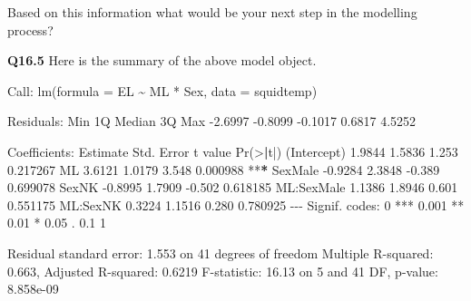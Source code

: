 \documentclass[
  oneside]{krantz}
\newenvironment{Shaded}{\begin{snugshade}}{\end{snugshade}}
\newcommand{\AttributeTok}[1]{\textcolor[rgb]{0.77,0.63,0.00}{#1}}
\newcommand{\DecValTok}[1]{\textcolor[rgb]{0.00,0.00,0.81}{#1}}
\newcommand{\ErrorTok}[1]{\textcolor[rgb]{0.64,0.00,0.00}{\textbf{#1}}}
\newcommand{\FloatTok}[1]{\textcolor[rgb]{0.00,0.00,0.81}{#1}}
\newcommand{\FunctionTok}[1]{\textcolor[rgb]{0.00,0.00,0.00}{#1}}
\newcommand{\NormalTok}[1]{#1}
\newcommand{\SpecialCharTok}[1]{\textcolor[rgb]{0.00,0.00,0.00}{#1}}
\newcommand{\StringTok}[1]{\textcolor[rgb]{0.31,0.60,0.02}{#1}}
\begin{document}
Based on this information what would be your next step in the modelling process?

\textbf{Q16.5} Here is the summary of the above model object.

\begin{Shaded}
\begin{Highlighting}[]
\NormalTok{Call}\SpecialCharTok{:}
\FunctionTok{lm}\NormalTok{(}\AttributeTok{formula =}\NormalTok{ EL }\SpecialCharTok{\textasciitilde{}}\NormalTok{ ML }\SpecialCharTok{*}\NormalTok{ Sex, }\AttributeTok{data =}\NormalTok{ squidtemp)}

\NormalTok{Residuals}\SpecialCharTok{:}
\NormalTok{    Min      1Q  Median      3Q     Max }
\SpecialCharTok{{-}}\FloatTok{2.6997} \SpecialCharTok{{-}}\FloatTok{0.8099} \SpecialCharTok{{-}}\FloatTok{0.1017}  \FloatTok{0.6817}  \FloatTok{4.5252} 

\NormalTok{Coefficients}\SpecialCharTok{:}
\NormalTok{                Estimate Std. Error t value }\FunctionTok{Pr}\NormalTok{(}\SpecialCharTok{\textgreater{}}\ErrorTok{|}\NormalTok{t}\SpecialCharTok{|}\NormalTok{)    }
\NormalTok{(Intercept)       }\FloatTok{1.9844}     \FloatTok{1.5836}   \FloatTok{1.253} \FloatTok{0.217267}    
\NormalTok{ML                }\FloatTok{3.6121}     \FloatTok{1.0179}   \FloatTok{3.548} \FloatTok{0.000988} \SpecialCharTok{**}\ErrorTok{*}
\NormalTok{SexMale          }\SpecialCharTok{{-}}\FloatTok{0.9284}     \FloatTok{2.3848}  \SpecialCharTok{{-}}\FloatTok{0.389} \FloatTok{0.699078}    
\NormalTok{SexNK            }\SpecialCharTok{{-}}\FloatTok{0.8995}     \FloatTok{1.7909}  \SpecialCharTok{{-}}\FloatTok{0.502} \FloatTok{0.618185}    
\NormalTok{ML}\SpecialCharTok{:}\NormalTok{SexMale        }\FloatTok{1.1386}     \FloatTok{1.8946}   \FloatTok{0.601} \FloatTok{0.551175}    
\NormalTok{ML}\SpecialCharTok{:}\NormalTok{SexNK          }\FloatTok{0.3224}     \FloatTok{1.1516}   \FloatTok{0.280} \FloatTok{0.780925}    
\SpecialCharTok{{-}{-}{-}}
\NormalTok{Signif. codes}\SpecialCharTok{:}  \DecValTok{0} \StringTok{\textquotesingle{}***\textquotesingle{}} \FloatTok{0.001} \StringTok{\textquotesingle{}**\textquotesingle{}} \FloatTok{0.01} \StringTok{\textquotesingle{}*\textquotesingle{}} \FloatTok{0.05} \StringTok{\textquotesingle{}.\textquotesingle{}} \FloatTok{0.1} \StringTok{\textquotesingle{} \textquotesingle{}} \DecValTok{1}

\NormalTok{Residual standard error}\SpecialCharTok{:} \FloatTok{1.553}\NormalTok{ on }\DecValTok{41}\NormalTok{ degrees of freedom}
\NormalTok{Multiple R}\SpecialCharTok{{-}}\NormalTok{squared}\SpecialCharTok{:}  \FloatTok{0.663}\NormalTok{,     Adjusted R}\SpecialCharTok{{-}}\NormalTok{squared}\SpecialCharTok{:}  \FloatTok{0.6219} 
\NormalTok{F}\SpecialCharTok{{-}}\NormalTok{statistic}\SpecialCharTok{:} \FloatTok{16.13}\NormalTok{ on }\DecValTok{5}\NormalTok{ and }\DecValTok{41}\NormalTok{ DF, p}\SpecialCharTok{{-}}\NormalTok{value}\SpecialCharTok{:} \FloatTok{8.858e{-}09}
\end{Highlighting}
\end{Shaded}
\end{document}
